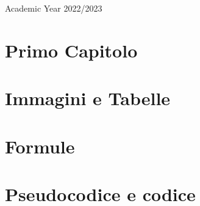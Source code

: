 \begin{titlepage}
\begin{center}
\vfill
{\large Academic Year 2022/2023}
\end{center}
\end{titlepage}

\thispagestyle{empty} %
\cleardoublepage

\thispagestyle{empty}

\clearpage{\pagestyle{plain}\cleardoublepage}


\clearpage{\pagestyle{plain}\cleardoublepage}

\tableofcontents %

\clearpage{\pagestyle{plain}\cleardoublepage} %



\clearpage{\pagestyle{plain}\cleardoublepage} %
\chapter{Primo Capitolo} %
\label{chapter:primo_capitolo} %

\clearpage{\pagestyle{plain}\cleardoublepage}
\chapter{Immagini e Tabelle} 
\label{chapter:immagini_e_tabelle} 
 

\clearpage{\pagestyle{plain}\cleardoublepage}
\chapter{Formule} 
\label{chapter:formule} 
 

\clearpage{\pagestyle{plain}\cleardoublepage}
\chapter{Pseudocodice e codice} 
\label{chapter:codice} 
 

\clearpage{\pagestyle{plain}\cleardoublepage}
%


